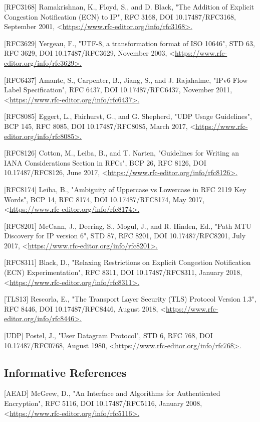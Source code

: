 \documentclass{article}
\begin{document}
[RFC3168]  Ramakrishnan, K., Floyd, S., and D. Black, "The Addition of Explicit Congestion Notification (ECN) to IP", RFC 3168, DOI 10.17487/RFC3168, September 2001, <\url{https://www.rfc-editor.org/info/rfc3168>.}

[RFC3629]  Yergeau, F., "UTF-8, a transformation format of ISO 10646", STD 63, RFC 3629, DOI 10.17487/RFC3629, November 2003, <\url{https://www.rfc-editor.org/info/rfc3629>.}

[RFC6437]  Amante, S., Carpenter, B., Jiang, S., and J. Rajahalme, "IPv6 Flow Label Specification", RFC 6437, DOI 10.17487/RFC6437, November 2011, <\url{https://www.rfc-editor.org/info/rfc6437>.}

[RFC8085]  Eggert, L., Fairhurst, G., and G. Shepherd, "UDP Usage Guidelines", BCP 145, RFC 8085, DOI 10.17487/RFC8085, March 2017, <\url{https://www.rfc-editor.org/info/rfc8085>.}

[RFC8126]  Cotton, M., Leiba, B., and T. Narten, "Guidelines for Writing an IANA Considerations Section in RFCs", BCP 26, RFC 8126, DOI 10.17487/RFC8126, June 2017, <\url{https://www.rfc-editor.org/info/rfc8126>.}

[RFC8174]  Leiba, B., "Ambiguity of Uppercase vs Lowercase in RFC 2119 Key Words", BCP 14, RFC 8174, DOI 10.17487/RFC8174, May 2017, <\url{https://www.rfc-editor.org/info/rfc8174>.}

[RFC8201]  McCann, J., Deering, S., Mogul, J., and R. Hinden, Ed., "Path MTU Discovery for IP version 6", STD 87, RFC 8201, DOI 10.17487/RFC8201, July 2017, <\url{https://www.rfc-editor.org/info/rfc8201>.}

[RFC8311]  Black, D., "Relaxing Restrictions on Explicit Congestion Notification (ECN) Experimentation", RFC 8311, DOI 10.17487/RFC8311, January 2018, <\url{https://www.rfc-editor.org/info/rfc8311>.}

[TLS13]    Rescorla, E., "The Transport Layer Security (TLS) Protocol Version 1.3", RFC 8446, DOI 10.17487/RFC8446, August 2018, <\url{https://www.rfc-editor.org/info/rfc8446>.}

[UDP]      Postel, J., "User Datagram Protocol", STD 6, RFC 768, DOI 10.17487/RFC0768, August 1980, <\url{https://www.rfc-editor.org/info/rfc768>.}

\subsection{Informative References}

[AEAD]     McGrew, D., "An Interface and Algorithms for Authenticated Encryption", RFC 5116, DOI 10.17487/RFC5116, January 2008, <\url{https://www.rfc-editor.org/info/rfc5116>.}
\end{document}
